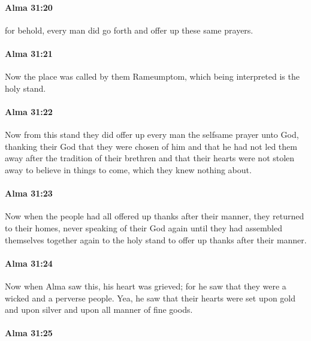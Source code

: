 		\paragraph{Alma 31:20} %
			\label{ALMA-31-20}

			for behold, every man did go forth and offer up these same prayers.

		\paragraph{Alma 31:21} %
			\label{ALMA-31-21}

			Now the place was called by them Rameumptom,
			which being interpreted is the holy stand.

		\paragraph{Alma 31:22} %
			\label{ALMA-31-22}

			Now from this stand they did offer up every man the selfsame prayer unto God,
			thanking their God that they were chosen of him
			and that he had not led them away after the tradition of their brethren
			and that their hearts were not stolen away
			to believe in things to come, which they knew nothing about.

		\paragraph{Alma 31:23} %
			\label{ALMA-31-23}

			Now when the people had all offered up thanks after their manner,
			they returned to their homes, never speaking of their God again
			until they had assembled themselves together again to the holy stand
			to offer up thanks after their manner.

		\paragraph{Alma 31:24} %
			\label{ALMA-31-24}

			Now when Alma saw this, his heart was grieved;
			for he saw that they were a wicked and a perverse people.
			Yea, he saw that their hearts were set upon gold and upon silver
			and upon all manner of fine goods.

		\paragraph{Alma 31:25} %
			\label{ALMA-31-25}

